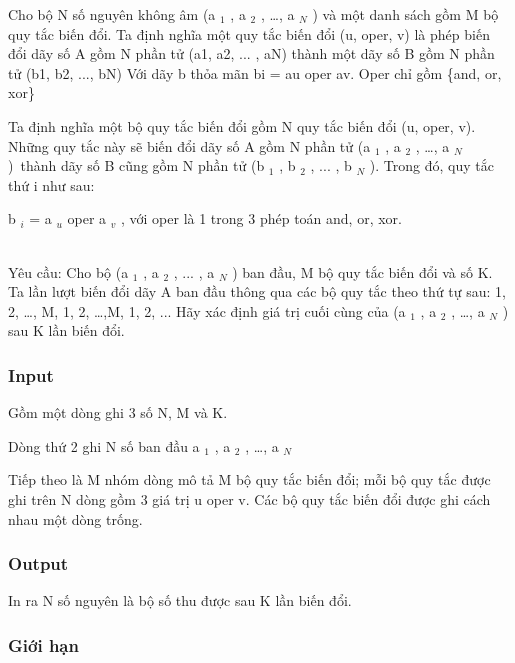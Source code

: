





   Cho bộ N số nguyên không âm (a   $_    1   $   , a   $_    2   $   , …, a   $_    N   $   ) và một danh sách gồm M bộ quy tắc biến đổi.       Ta định nghĩa một quy tắc biến đổi (u, oper, v) là phép biến đổi dãy số A gồm N phần tử (a1, a2, ... , aN) thành một dãy số B gồm N phần tử (b1, b2, ..., bN)       Với dãy b thỏa mãn       bi = au oper av. Oper chỉ gồm \{and, or, xor\}    

   Ta định nghĩa một bộ quy tắc biến đổi gồm N quy tắc biến đổi (u, oper, v). Những quy tắc này sẽ biến đổi dãy số A gồm N phần tử (a   $_    1   $   , a   $_    2   $   , …, a   $_    N   $   ) thành dãy số B cũng gồm N phần tử (b   $_    1   $   , b   $_    2   $   , ... , b   $_    N   $   ). Trong đó, quy tắc thứ i như sau:  

   b   $_    i   $   = a   $_    u   $   oper a   $_    v   $   , với oper là 1 trong 3 phép toán and, or, xor.  


\\   Yêu cầu: Cho bộ (a   $_    1   $   , a   $_    2   $   , ... , a   $_    N   $   ) ban đầu, M bộ quy tắc biến đổi và số K. Ta lần lượt biến đổi dãy A ban đầu thông qua các bộ quy tắc theo thứ tự sau: 1, 2, …, M, 1, 2, …,M, 1, 2, ... Hãy xác định giá trị cuối cùng của (a   $_    1   $   , a   $_    2   $   , …, a   $_    N   $   ) sau K lần biến đổi.  

\subsubsection{   Input  }



   Gồm một dòng ghi 3 số N, M và K.  

   Dòng thứ 2 ghi N số ban đầu a   $_    1   $   , a   $_    2   $   , …, a   $_    N   $

    Tiếp theo là M nhóm dòng mô tả M bộ quy tắc biến đổi; mỗi bộ quy tắc được ghi trên N dòng gồm 3 giá trị u oper v. Các bộ quy tắc biến đổi được ghi cách nhau một dòng trống.   

\subsubsection{   Output  }

     In ra N số nguyên là bộ số thu được sau K lần biến đổi.    

\subsubsection{     Giới hạn    }



